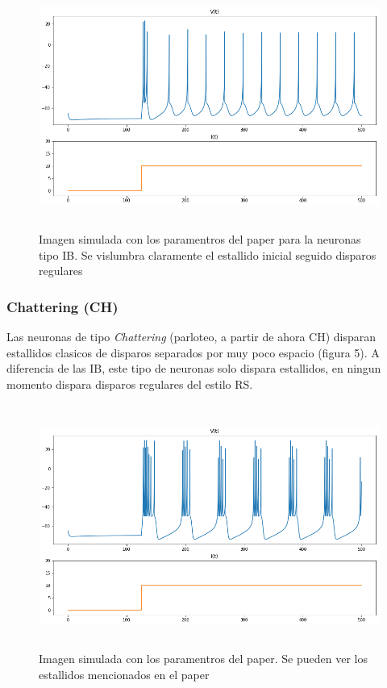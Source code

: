 \documentclass[12pt]{article}
\begin{document}
\begin{figure}[h!]
    \centering
        \includegraphics[height=8cm]{images/IB.png}
    \caption[fontsize=2pt]{Imagen simulada con los paramentros del paper para la neuronas tipo IB. Se vislumbra claramente el estallido inicial seguido disparos regulares}
\end{figure}
\newpage

 \subsubsection{Chattering (CH)}

 Las neuronas de tipo \textit{Chattering} (parloteo, a partir de ahora CH) disparan estallidos clasicos de disparos separados por muy poco espacio (figura 5). A diferencia de las IB, este tipo de neuronas solo dispara estallidos, en ningun momento dispara disparos regulares del estilo RS.

 \begin{figure}[h!]
    \centering
        \includegraphics[height=8cm]{images/CH.png}
    \caption[fontsize=2pt]{Imagen simulada con los paramentros del paper. Se pueden ver los estallidos mencionados en el paper}
\end{figure}
\end{document}
